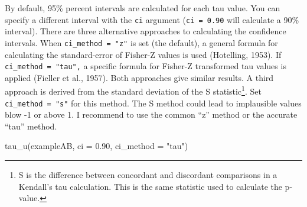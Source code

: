 \documentclass[
  letterpaper,
  DIV=11,
  numbers=noendperiod]{scrreprt}
\newenvironment{Shaded}{\begin{snugshade}}{\end{snugshade}}
\newcommand{\AttributeTok}[1]{\textcolor[rgb]{0.40,0.45,0.13}{#1}}
\newcommand{\FloatTok}[1]{\textcolor[rgb]{0.68,0.00,0.00}{#1}}
\newcommand{\FunctionTok}[1]{\textcolor[rgb]{0.28,0.35,0.67}{#1}}
\newcommand{\NormalTok}[1]{\textcolor[rgb]{0.00,0.23,0.31}{#1}}
\newcommand{\StringTok}[1]{\textcolor[rgb]{0.13,0.47,0.30}{#1}}
\begin{document}
By default, 95\% percent intervals are calculated for each tau value.
You can specify a different interval with the \texttt{ci} argument
(\texttt{ci\ =\ 0.90} will calculate a 90\% interval). There are three
alternative approaches to calculating the confidence intervals. When
\texttt{ci\_method\ =\ "z"} is set (the default), a general formula for
calculating the standard-error of Fisher-Z values is used (Hotelling,
1953). If \texttt{ci\_method\ =\ "tau",} a specific formula for Fisher-Z
transformed tau values is applied (Fieller et al., 1957). Both
approaches give similar results. A third approach is derived from the
standard deviation of the S statistic\footnote{S is the difference
  between concordant and discordant comparisons in a Kendall's tau
  calculation. This is the same statistic used to calculate the p-value.}.
Set \texttt{ci\_method\ =\ "s"} for this method. The S method could lead
to implausible values blow -1 or above 1. I recommend to use the common
``z'' method or the accurate ``tau'' method.

\begin{Shaded}
\begin{Highlighting}[]
\FunctionTok{tau\_u}\NormalTok{(exampleAB, }\AttributeTok{ci =} \FloatTok{0.90}\NormalTok{, }\AttributeTok{ci\_method =} \StringTok{"tau"}\NormalTok{)}
\end{Highlighting}
\end{Shaded}
\end{document}
